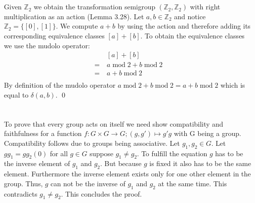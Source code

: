 \documentclass[a4paper,12pt,numbers=noenddot]{scrreport}
\DeclareMathOperator{\mmod}{mod}
\begin{document}
\section{}
Given $\mathbb{Z}_2$ we obtain the transformation semigroup $(\mathbb{Z}_2,\mathbb{Z}_2)$ with right multiplication as an action (Lemma 3.28).
Let $a,b \in \mathbb{Z}_2$ and notice $\mathbb{Z}_2 = \{[0],[1]\}$.
We compute $a+b$ by using the action and therefore adding its corresponding equivalence classes $[a] + [b]$.
To obtain the equivalence classes we use the mudolo operator:
\begin{align*}
    &[a] + [b]\\
    =\ &a\mmod2 + b \mmod2 \\
    =\ &a + b \mmod2 \\
\end{align*}
By definition of the mudolo operator $a \mmod2 + b \mmod2 = a + b \mmod2$ which is equal to $\delta(a,b)$.
\qed

\section{}
To prove that every group acts on itself we need show compatibility and faithfulness for a function $f: G \times G \rightarrow G; (g,g') \mapsto g'g$ with G being a group.
Compatibility follows  due to groups being associative.
Let $g_1,g_2 \in G$.
Let $gg_1 = gg_2 (0)$ for all $g \in G$ suppose $g_1 \neq g_2$.
To fulfill the equation $g$ has to be the inverse element of $g_1$ and $g_2$.
But because $g$ is fixed it also has to be the same element.
Furthermore the inverse element exists only for one other element in the group.
Thus, $g$ can not be the inverse of $g_1$ and $g_2$ at the same time.
This contradicts $g_1 \neq g_2$.
This concludes the proof.
\end{document}
